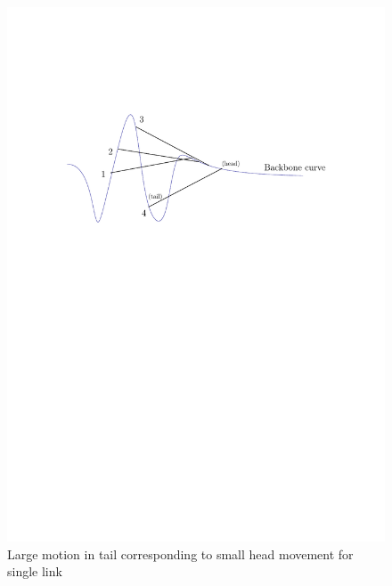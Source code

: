 \documentclass[12pt,a4]{article}
\begin{document}
\begin{figure}[ht!]
    \centering
    \includegraphics[scale=0.75]{figures/backbone.pdf}
        \caption{Large motion in tail corresponding to small head movement for single link}
        \label{fig:backbone}
\end{figure}
\end{document}
